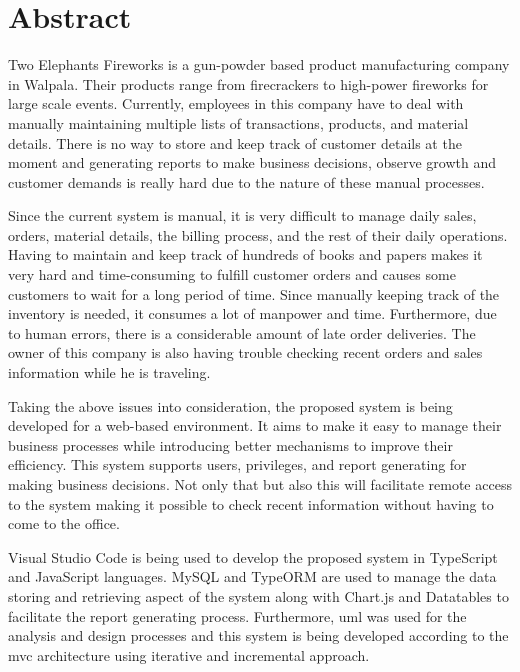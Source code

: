 \documentclass[12pt]{report}
\begin{document}
\noindent
{}

\newpage
\thispagestyle{plain}
\chapter*{\Huge Abstract}

Two Elephants Fireworks is a gun-powder based product manufacturing company in Walpala. Their products range from firecrackers to high-power fireworks for large scale events. Currently, employees in this company have to deal with manually maintaining multiple lists of transactions, products, and material details. There is no way to store and keep track of customer details at the moment and generating reports to make business decisions, observe growth and customer demands is really hard due to the nature of these manual processes.

Since the current system is manual, it is very difficult to manage daily sales, orders, material details, the billing process, and the rest of their daily operations. Having to maintain and keep track of hundreds of books and papers makes it very hard and time-consuming to fulfill customer orders and causes some customers to wait for a long period of time. Since manually keeping track of the inventory is needed, it consumes a lot of manpower and time. Furthermore, due to human errors, there is a considerable amount of late order deliveries. The owner of this company is also having trouble checking recent orders and sales information while he is traveling.

Taking the above issues into consideration, the proposed system is being developed for a web-based environment. It aims to make it easy to manage their business processes while introducing better mechanisms to improve their efficiency. This system supports users, privileges, and report generating for making business decisions. Not only that but also this will facilitate remote access to the system making it possible to check recent information without having to come to the office.

Visual Studio Code is being used to develop the proposed system in TypeScript and JavaScript languages. MySQL and TypeORM are used to manage the data storing and retrieving aspect of the system along with Chart.js and Datatables to facilitate the report generating process. Furthermore, \acrlong{uml} was used for the analysis and design processes and this system is being developed according to the \acrshort{mvc} architecture using iterative and incremental approach.
\end{document}
